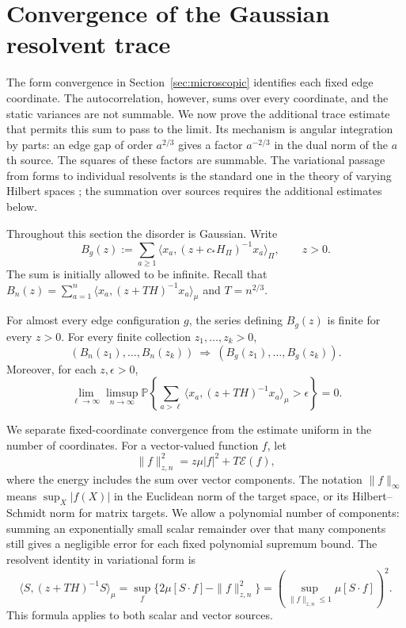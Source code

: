 \section{Convergence of the Gaussian resolvent trace}
\label{sec:trace}

The form convergence in Section~\ref{sec:microscopic} identifies each
fixed edge coordinate.  The autocorrelation, however, sums over every
coordinate, and the static variances are not summable.  We now prove the
additional trace estimate that permits this sum to pass to the limit.
Its mechanism is angular integration by parts: an edge gap of order
$a^{2/3}$ gives a factor $a^{-2/3}$ in the dual norm of the $a$th source.
The squares of these factors are summable.
The variational passage from forms to individual resolvents is the
standard one in the theory of varying Hilbert spaces
\cite[Theorem~2.4]{KuwaeShioya2003}; the summation over sources requires
the additional estimates below.

Throughout this section the disorder is Gaussian.  Write
\begin{equation}
 B_g(z):=\sum_{a\geq1}
 \big\langle x_a,(z+c_*H_\Pi)^{-1}x_a\big\rangle_\Pi,
 \qquad z>0.
 \label{eq:source-40}
\end{equation}
The sum is initially allowed to be infinite.  Recall that
$B_n(z)=\sum_{a=1}^n\langle x_a,(z+TH)^{-1}x_a\rangle_\mu$ and
$T=n^{2/3}$.

\begin{proposition}
\label{prop:trace-goe}
For almost every edge configuration $g$, the series defining $B_g(z)$
is finite for every $z>0$.  For every finite collection $z_1,\ldots,z_k>0$,
\[
 (B_n(z_1),\ldots,B_n(z_k))
 \ \Longrightarrow\ (B_g(z_1),\ldots,B_g(z_k)).
\]
Moreover, for each $z,\epsilon>0$,
\[
 \lim_{\ell\to\infty}\limsup_{n\to\infty}
 \mathbb P\left\{
 \sum_{a>\ell}\langle x_a,(z+TH)^{-1}x_a\rangle_\mu
 >\epsilon\right\}=0.
\]
\end{proposition}

We separate fixed-coordinate convergence from the estimate uniform in
the number of coordinates.  For a vector-valued function $f$, let
\[
 \|f\|_{z,n}^2=z\mu|f|^2+T\mathcal E(f),
\]
where the energy includes the sum over vector components.
The notation $\|f\|_\infty$ means $\sup_X|f(X)|$ in the Euclidean norm
of the target space, or its Hilbert--Schmidt norm for matrix targets.
We allow a polynomial number of components: summing an exponentially
small scalar remainder over that many components still gives a
negligible error for each fixed polynomial supremum bound.
The resolvent identity in variational form is
\[
 \langle S,(z+TH)^{-1}S\rangle_\mu
 =\sup_f\{2\mu[S\cdot f]-\|f\|_{z,n}^2\}
 =\left(\sup_{\|f\|_{z,n}\leq1}\mu[S\cdot f]\right)^2.
\]
This formula applies to both scalar and vector sources.

